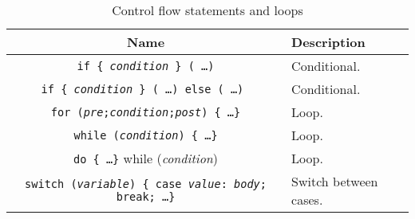 \documentclass[onecolumn, oneside, a4paper, 11pt]{memoir}
\theoremstyle{remark}
\begin{document}
\begin{table}[h!]
\centering
\caption{Control flow statements and loops}
\begin{tabular}{|c|l|}
  \hline
  Name & Description \\
  \hline
  \texttt{if \{ \textit{condition} \} ( \dots )} & Conditional. \\
  \texttt{if \{ \textit{condition} \} ( \dots ) else ( \dots ) } & Conditional. \\
  \texttt{for (\textit{pre};\textit{condition};\textit{post}) \{ \dots \}} & Loop. \\
  \texttt{while (\textit{condition}) \{ \dots \}} & Loop. \\
  \texttt{do \{ \dots \}} while (\textit{condition})  & Loop. \\
  \texttt{switch (\textit{variable}) \{ case \textit{value}: \textit{body}; break; \dots \}} & Switch between cases. \\
  \hline
\end{tabular}
\end{table}
\end{document}
